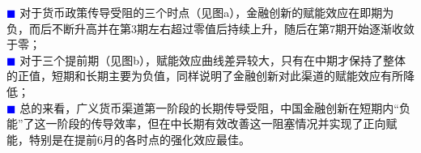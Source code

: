 \documentclass[12pt,aspectratio=169]{ctexbeamer}
\begin{document}
\begin{frame}
				\hspace{2em}
				\textcolor{blue}{\tiny $\blacksquare$} 对于货币政策传导受阻的三个时点（见图a），金融创新的赋能效应在即期为负，而后不断升高并在第3期左右超过零值后持续上升，随后在第7期开始逐渐收敛于零；\\
				\hspace{2em}
				\textcolor{blue}{\tiny $\blacksquare$} 对于三个提前期（见图b），赋能效应曲线差异较大，只有在中期才保持了整体的正值，短期和长期主要为负值，同样说明了金融创新对此渠道的赋能效应有所降低；\\
				\hspace{2em}
				\textcolor{blue}{\tiny $\blacksquare$} 总的来看，广义货币渠道第一阶段的长期传导受阻，中国金融创新在短期内“负能”了这一阶段的传导效率，但在中长期有效改善这一阻塞情况并实现了正向赋能，特别是在提前6月的各时点的强化效应最佳。
			\end{frame}
\end{document}
